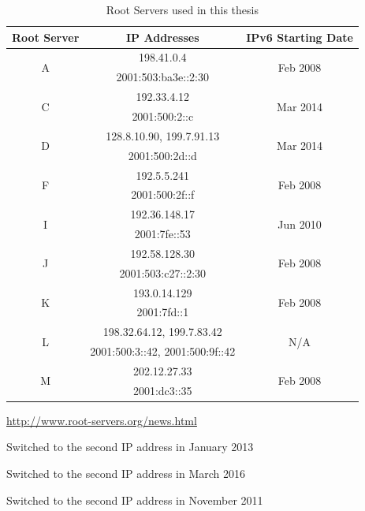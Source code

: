 \begin{table}[h]
	\centering
	\begin{threeparttable}	
		\begin{tabular}{c c c}
			\hline
			\textbf{Root Server} & \textbf{IP Addresses}	& \textbf{IPv6 Starting Date\tnote{a}} \\ \hline\hline
			\multirow{2}{*}{A}	& 198.41.0.4	& \multirow{2}{*}{Feb 2008}  \\ & 2001:503:ba3e::2:30 \\  \hline
			
			\multirow{2}{*}{C}	& 192.33.4.12	& \multirow{2}{*}{Mar 2014}  \\ & 2001:500:2::c \\  \hline
			
			\multirow{2}{*}{D}	& 128.8.10.90, 199.7.91.13\tnote{b}	& \multirow{2}{*}{Mar 2014}  \\ & 2001:500:2d::d \\  \hline		
			
			\multirow{2}{*}{F}	& 192.5.5.241	& \multirow{2}{*}{Feb 2008}  \\ & 2001:500:2f::f \\  \hline				
			
			\multirow{2}{*}{I}	& 192.36.148.17	& \multirow{2}{*}{Jun 2010}  \\ & 2001:7fe::53 \\  \hline						
			
			\multirow{2}{*}{J}	& 192.58.128.30	& \multirow{2}{*}{Feb 2008}  \\ & 2001:503:c27::2:30 \\  \hline								
			
			\multirow{2}{*}{K}	& 193.0.14.129	& \multirow{2}{*}{Feb 2008}  \\ & 2001:7fd::1 \\  \hline	
			
			\multirow{2}{*}{L}	& 198.32.64.12, 199.7.83.42\tnote{c}	& \multirow{2}{*}{N/A}  \\ & 2001:500:3::42, 2001:500:9f::42\tnote{d} \\  
			\hline
			
			\multirow{2}{*}{M}	& 202.12.27.33	& \multirow{2}{*}{Feb 2008}  \\ & 2001:dc3::35 \\  \hline	
		\end{tabular}
		\begin{tablenotes}
			\item \url{http://www.root-servers.org/news.html}
			\item Switched to the second IP address in January 2013
			\item Switched to the second IP address in March 2016
			\item Switched to the second IP address in November 2011
		\end{tablenotes}
		\caption{Root Servers used in this thesis}
		\label{table:ch03:root-servers}
		
	\end{threeparttable}
\end{table}

